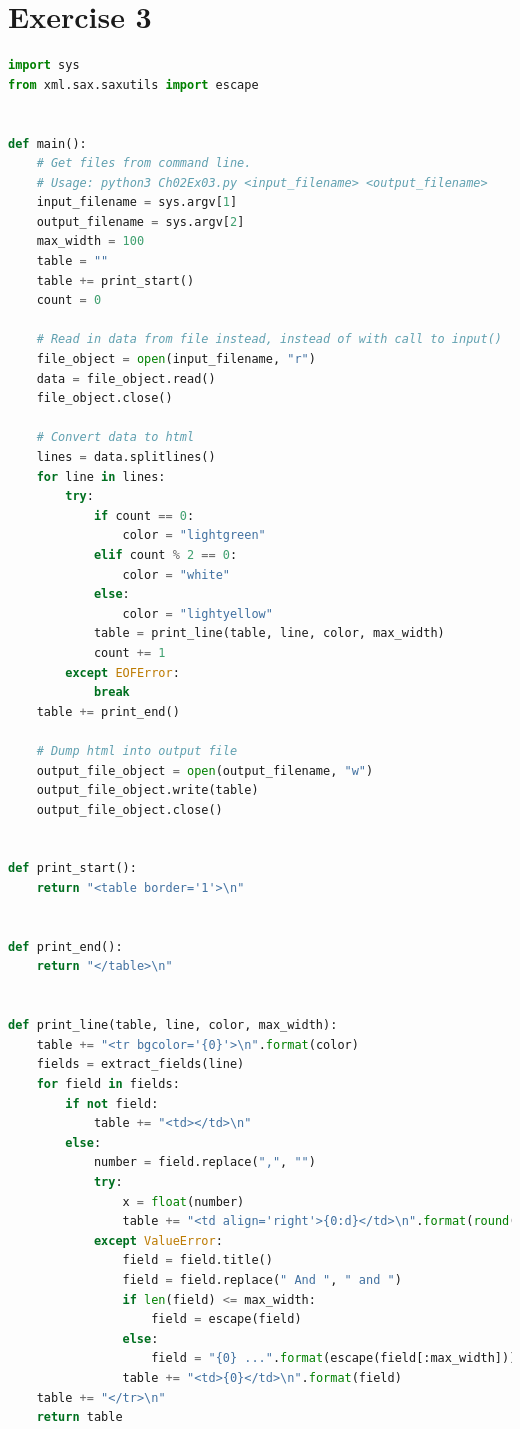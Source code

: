 \documentclass{report}
\begin{document}
\section*{Exercise 3}
\begin{lstlisting}[language=Python, style=pythonStyle]
import sys
from xml.sax.saxutils import escape


def main():
    # Get files from command line.
    # Usage: python3 Ch02Ex03.py <input_filename> <output_filename>
    input_filename = sys.argv[1]
    output_filename = sys.argv[2]
    max_width = 100
    table = ""
    table += print_start()
    count = 0

    # Read in data from file instead, instead of with call to input()
    file_object = open(input_filename, "r")
    data = file_object.read()
    file_object.close()

    # Convert data to html
    lines = data.splitlines()
    for line in lines:
        try:
            if count == 0:
                color = "lightgreen"
            elif count % 2 == 0:
                color = "white"
            else:
                color = "lightyellow"
            table = print_line(table, line, color, max_width)
            count += 1
        except EOFError:
            break
    table += print_end()

    # Dump html into output file
    output_file_object = open(output_filename, "w")
    output_file_object.write(table)
    output_file_object.close()


def print_start():
    return "<table border='1'>\n"


def print_end():
    return "</table>\n"


def print_line(table, line, color, max_width):
    table += "<tr bgcolor='{0}'>\n".format(color)
    fields = extract_fields(line)
    for field in fields:
        if not field:
            table += "<td></td>\n"
        else:
            number = field.replace(",", "")
            try:
                x = float(number)
                table += "<td align='right'>{0:d}</td>\n".format(round(x))
            except ValueError:
                field = field.title()
                field = field.replace(" And ", " and ")
                if len(field) <= max_width:
                    field = escape(field)
                else:
                    field = "{0} ...".format(escape(field[:max_width]))
                table += "<td>{0}</td>\n".format(field)
    table += "</tr>\n"
    return table



\end{lstlisting}
\end{document}
